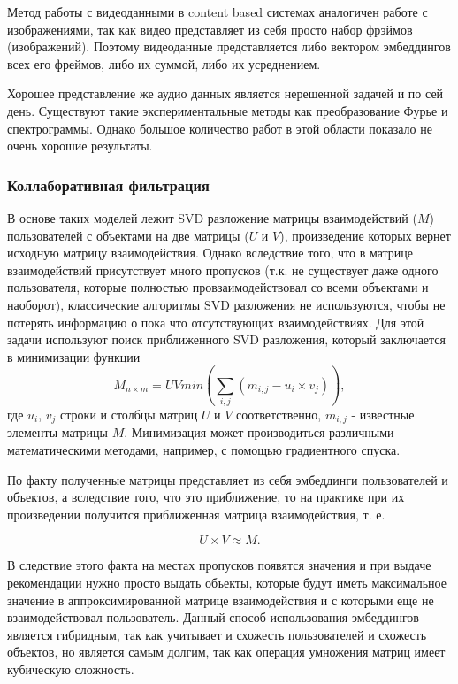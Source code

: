 \documentclass[bachelor, och, coursework]{SCWorks}
\begin{document}
Метод работы с видеоданными в content based системах аналогичен работе с изображениями, так как видео представляет
из себя просто набор фрэймов (изображений). Поэтому видеоданные представляется либо вектором эмбеддингов всех его фреймов,
либо их суммой, либо их усреднением.

Хорошее представление же аудио данных является нерешенной задачей и по сей день. Существуют такие экспериментальные
методы как преобразование Фурье и спектрограммы. Однако большое количество работ в этой области показало не очень
хорошие результаты.
\subsubsection{Коллаборативная фильтрация}
В основе таких моделей лежит SVD разложение матрицы взаимодействий ($M$) пользователей с объектами на две матрицы ($U$ и $V$),
произведение которых вернет исходную матрицу взаимодействия. Однако вследствие того, что в матрице взаимодействий присутствует много
пропусков (т.к. не существует даже одного пользователя, которые полностью провзаимодействовал со всеми объектами
и наоборот), классические алгоритмы SVD разложения не используются, чтобы не потерять информацию о пока что отсутствующих
взаимодействиях. Для этой задачи используют поиск приближенного SVD разложения, который заключается в минимизации
функции 
\begin{equation}
    M_{n\times m} = UVmin(\sum_{i,j}(m_{i,j}-u_i \times v_j)),
\end{equation}
где $u_i$, $v_j$ строки и столбцы матриц $U$ и $V$ соответственно, $m_{i,j}$ - известные элементы матрицы $M$.
Минимизация может производиться различными математическими методами, например, с помощью градиентного спуска.

По факту полученные матрицы представляет из себя эмбеддинги пользователей и объектов, а вследствие того, что это приближение,
то на практике при их произведении получится приближенная матрица взаимодействия, т. е.

\begin{equation}
    U \times V \approx M.
\end{equation}

В следствие этого факта на местах пропусков появятся значения и при выдаче рекомендации нужно просто
выдать объекты, которые будут иметь максимальное значение в аппроксимированной матрице взаимодействия
и с которыми еще не взаимодействовал пользователь. Данный способ использования эмбеддингов является
гибридным, так как учитывает и схожесть пользователей и схожесть объектов, но является самым долгим,
так как операция умножения матриц имеет кубическую сложность.
\end{document}

